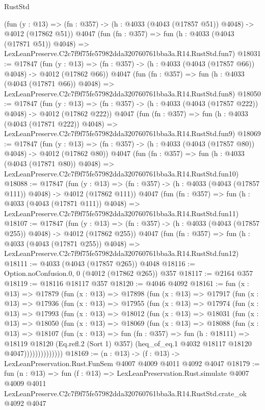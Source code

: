 \begin{lexlean}{RustStd}
\begin{coremodule}
    (fun (y : @13) => (fn : @357) -> (h : @4033 (@4043 (@17857 @51)) @4048) -> @4012 (@17862 @51))
    @4047
    (fun (fn : @357) =>
    fun (h : @4033 (@4043 (@17871 @51)) @4048) =>
    LexLeanPreserve.C2c7f9f75fe57982dda320760761bba3a.R14.RustStd.fun7)
@18031 := @17847
    (fun (y : @13) => (fn : @357) -> (h : @4033 (@4043 (@17857 @66)) @4048) -> @4012 (@17862 @66))
    @4047
    (fun (fn : @357) =>
    fun (h : @4033 (@4043 (@17871 @66)) @4048) =>
    LexLeanPreserve.C2c7f9f75fe57982dda320760761bba3a.R14.RustStd.fun8)
@18050 := @17847
    (fun (y : @13) => (fn : @357) -> (h : @4033 (@4043 (@17857 @222)) @4048) -> @4012 (@17862 @222))
    @4047
    (fun (fn : @357) =>
    fun (h : @4033 (@4043 (@17871 @222)) @4048) =>
    LexLeanPreserve.C2c7f9f75fe57982dda320760761bba3a.R14.RustStd.fun9)
@18069 := @17847
    (fun (y : @13) => (fn : @357) -> (h : @4033 (@4043 (@17857 @80)) @4048) -> @4012 (@17862 @80))
    @4047
    (fun (fn : @357) =>
    fun (h : @4033 (@4043 (@17871 @80)) @4048) =>
    LexLeanPreserve.C2c7f9f75fe57982dda320760761bba3a.R14.RustStd.fun10)
@18088 := @17847
    (fun (y : @13) => (fn : @357) -> (h : @4033 (@4043 (@17857 @111)) @4048) -> @4012 (@17862 @111))
    @4047
    (fun (fn : @357) =>
    fun (h : @4033 (@4043 (@17871 @111)) @4048) =>
    LexLeanPreserve.C2c7f9f75fe57982dda320760761bba3a.R14.RustStd.fun11)
@18107 := @17847
    (fun (y : @13) => (fn : @357) -> (h : @4033 (@4043 (@17857 @255)) @4048) -> @4012 (@17862 @255))
    @4047
    (fun (fn : @357) =>
    fun (h : @4033 (@4043 (@17871 @255)) @4048) =>
    LexLeanPreserve.C2c7f9f75fe57982dda320760761bba3a.R14.RustStd.fun12)
@18111 := @4033 (@4043 (@17857 @265)) @4048
@18116 := Option.noConfusion.{0, 0} (@4012 (@17862 @265)) @357
@18117 := @2164 @357
@18119 := @18116 @18117 @357
@18120 := @4046 @4092
@18161 := fun (x : @13) =>
  @17879
    (fun (x : @13) =>
    @17898
      (fun (x : @13) =>
      @17917
        (fun (x : @13) =>
        @17936
          (fun (x : @13) =>
          @17955
            (fun (x : @13) =>
            @17974
              (fun (x : @13) =>
              @17993
                (fun (x : @13) =>
                @18012
                  (fun (x : @13) =>
                  @18031
                    (fun (x : @13) =>
                    @18050
                      (fun (x : @13) =>
                      @18069
                        (fun (x : @13) =>
                        @18088
                          (fun (x : @13) =>
                          @18107
                            (fun (x : @13) =>
                            fun (fn : @357) =>
                            fun (h : @18111) =>
                            @18119
                              @18120
                              (Eq.refl.{2} (Sort 1) @357)
                              (heq_of_eq.{1} @4032 @18117 @18120 @4047))))))))))))))
@18169 := (n : @13) -> (f : @13) -> LexLeanPreservation.Rust.FunSem @4007 @4009 @4011 @4092 @4047
@18179 := fun (n : @13) =>
  fun (f : @13) =>
  LexLeanPreservation.Rust.simulate
    @4007
    @4009
    @4011
    LexLeanPreserve.C2c7f9f75fe57982dda320760761bba3a.R14.RustStd.crate_ok
    @4092
    @4047
\end{coremodule}
\end{lexlean}
